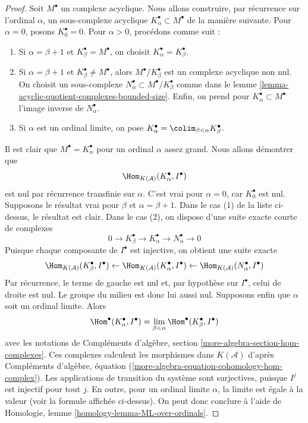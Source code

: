 \begin{proof}
Soit $M^\bullet$ un complexe acyclique. Nous allons construire, par
récurrence sur l'ordinal $\alpha$, un sous-complexe acyclique
$K_\alpha^\bullet \subset M^\bullet$ de la manière suivante.
Pour $\alpha = 0$, posons $K_0^\bullet = 0$. Pour $\alpha > 0$,
procédons comme suit :
\begin{enumerate}
\item Si $\alpha = \beta + 1$ et $K_\beta^\bullet = M^\bullet$,
on choisit $K_\alpha^\bullet = K_\beta^\bullet$.
\item Si $\alpha = \beta + 1$ et $K_\beta^\bullet \not = M^\bullet$,
alors $M^\bullet/K_\beta^\bullet$ est un complexe acyclique non nul.
On choisit un sous-complexe
$N_\alpha^\bullet \subset M^\bullet/K_\beta^\bullet$ comme dans le
lemme \ref{lemma-acyclic-quotient-complexes-bounded-size}.
Enfin, on prend pour $K_\alpha^\bullet \subset M^\bullet$
l'image inverse de $N_\alpha^\bullet$.
\item Si $\alpha$ est un ordinal limite, on pose
$K_\alpha^\bullet = \colim_{\beta < \alpha} K_\beta^\bullet$.
\end{enumerate}
Il est clair que $M^\bullet = K_\alpha^\bullet$ pour un ordinal $\alpha$
assez grand. Nous allons démontrer que
$$
\Hom_{K(\mathcal{A})}(K_\alpha^\bullet, I^\bullet)
$$
est nul par récurrence transfinie sur $\alpha$. C'est vrai pour $\alpha = 0$,
car $K_0^\bullet$ est nul. Supposons le résultat vrai pour $\beta$ et
$\alpha = \beta + 1$. Dans le cas (1) de la liste ci-dessus, le résultat est
clair. Dans le cas (2), on dispose d'une suite exacte courte de complexes
$$
0 \to K_\beta^\bullet \to K_\alpha^\bullet \to N_\alpha^\bullet \to 0
$$
Puisque chaque composante de $I^\bullet$ est injective, on obtient une suite
exacte
$$
\Hom_{K(\mathcal{A})}(K_\beta^\bullet, I^\bullet) \leftarrow
\Hom_{K(\mathcal{A})}(K_\alpha^\bullet, I^\bullet) \leftarrow
\Hom_{K(\mathcal{A})}(N_\alpha^\bullet, I^\bullet)
$$
Par récurrence, le terme de gauche est nul et, par hypothèse sur
$I^\bullet$, celui de droite est nul. Le groupe du milieu est donc lui aussi
nul. Supposons enfin que $\alpha$ soit un ordinal limite. Alors
$$
\Hom^\bullet(K_\alpha^\bullet, I^\bullet) =
\lim_{\beta < \alpha} \Hom^\bullet(K_\beta^\bullet, I^\bullet)
$$
avec les notations de
Compléments d'algèbre, section \ref{more-algebra-section-hom-complexes}.
Ces complexes calculent les morphismes dans $K(\mathcal{A})$ d'après
Compléments d'algèbre, équation
(\ref{more-algebra-equation-cohomology-hom-complex}).
Les applications de transition du système sont surjectives, puisque $I^j$
est injectif pour tout $j$. En outre, pour un ordinal limite $\alpha$, la
limite est égale à la valeur (voir la formule affichée ci-dessus). On peut donc
conclure à l'aide de
Homologie, lemme \ref{homology-lemma-ML-over-ordinals}.
\end{proof}

